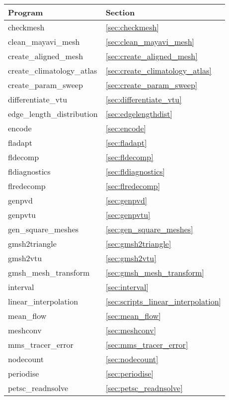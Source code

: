 \begin{table}
\begin{center}
  \begin{tabular}{| l | l |}
    \hline
	Program					& Section 				\\
    \hline
	checkmesh				& \ref{sec:checkmesh}			\\
  clean\_mayavi\_mesh       & \ref{sec:clean_mayavi_mesh} \\
	create\_aligned\_mesh 			& \ref{sec:create_aligned_mesh}	\\
	create\_climatology\_atlas		& \ref{sec:create_climatology_atlas}	\\
	create\_param\_sweep			& \ref{sec:create_param_sweep}		\\
	differentiate\_vtu          		& \ref{sec:differentiate_vtu}		\\
	edge\_length\_distribution		& \ref{sec:edgelengthdist} 		\\
	encode                  		& \ref{sec:encode} 	        	\\
	fladapt					& \ref{sec:fladapt}			\\
	fldecomp				& \ref{sec:fldecomp}			\\
	fldiagnostics				& \ref{sec:fldiagnostics}		\\
	flredecomp				& \ref{sec:flredecomp}			\\
	genpvd					& \ref{sec:genpvd} \\
	genpvtu					& \ref{sec:genpvtu}			\\
	gen\_square\_meshes			& \ref{sec:gen_square_meshes} 		\\
	gmsh2triangle				& \ref{sec:gmsh2triangle}		\\
  gmsh2vtu & \ref{sec:gmsh2vtu} \\
	gmsh\_mesh\_transform			& \ref{sec:gmsh_mesh_transform}	\\
	interval				& \ref{sec:interval} 			\\
	linear\_interpolation			& \ref{sec:scripts_linear_interpolation} \\
	mean\_flow				& \ref{sec:mean_flow}			\\
	meshconv				& \ref{sec:meshconv} \\
	mms\_tracer\_error			& \ref{sec:mms_tracer_error}		\\
	nodecount				& \ref{sec:nodecount}			\\
	periodise				& \ref{sec:periodise}			\\
	petsc\_readnsolve			& \ref{sec:petsc_readnsolve} 		\\

\end{tabular}
\end{center}
\end{table}
